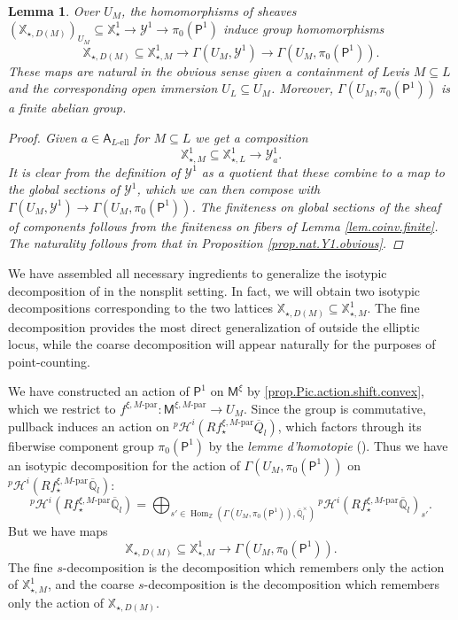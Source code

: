 \documentclass[openany]{amsbook}
\newtheorem{lemma}[theorem]{Lemma}
\theoremstyle{definition}
\theoremstyle{remark}
\numberwithin{equation}{section}
\newcommand{\Q}{\mathbb{Q}}
\newcommand{\Z}{\mathbb{Z}}
\newcommand{\cY}{\mathcal{Y}}
\newcommand{\ol}[1]{\overline{#1}}
\renewcommand{\-}{\operatorname{-}}
\newcommand{\Hom}{\operatorname{Hom}}
\newcommand{\pHi}{{}^p \mathcal{H}^i}
\newcommand{\el}{\text{-ell}}
\newcommand{\bM}{\mathsf{M}}
\newcommand{\bA}{\mathsf{A}}
\newcommand{\bX}{\mathbb{X}}
\newcommand{\bAe}[1]{\bA_{#1\el}}
\newcommand{\bP}{\mathsf{P}}
\newcommand{\Mpar}{M\text{-par}}
\begin{document}
\begin{lemma}\label{lem.glblsect.Pcmpts.finite}
    Over $U_M$, the homomorphisms of sheaves $(\bX_{\star, D(M)})_{U_M} \subseteq \bX_{\star}^1 \to \cY^1 \to \pi_0(\bP^{1})$ induce group homomorphisms
    $$
        \bX_{\star, D(M)} \subseteq \bX_{\star,M}^1 \to \Gamma(U_M, \cY^1) \to \Gamma(U_M, \pi_0(\bP^{1})).
    $$
    These maps are natural in the obvious sense given a containment of Levis $M \subseteq L$ and the corresponding open immersion $U_L \subseteq U_M$. Moreover, $\Gamma(U_M, \pi_0(\bP^{1}))$ is a finite abelian group.
    \begin{proof}
        Given $a \in \bAe{L}$ for $M \subseteq L$ we get a composition $$\bX_{\star, M}^1 \subseteq \bX_{\star, L}^1 \to \cY^1_a.$$ It is clear from the definition of $\cY^1$ as a quotient that these combine to a map to the global sections of $\cY^1$, which we can then compose with $\Gamma(U_M, \cY^1) \to \Gamma(U_M, \pi_0(\bP^{1}))$. The finiteness on global sections of the sheaf of components follows from the finiteness on fibers of Lemma \ref{lem.coinv.finite}. The naturality follows from that in Proposition \ref{prop.nat.Y1.obvious}.
    \end{proof}
\end{lemma}



We have assembled all necessary ingredients to generalize the isotypic decomposition of \cite[8.5]{CLII} in the nonsplit setting. In fact, we will obtain two isotypic decompositions corresponding to the two lattices $\bX_{\star, D(M)} \subseteq \bX_{\star,M}^1$. The fine decomposition provides the most direct generalization of \cite[\S 6.2]{ngofl} outside the elliptic locus, while the coarse decomposition will appear naturally for the purposes of point-counting.

We have constructed an action of $\bP^{1}$ on $\bM^{\xi}$ by \ref{prop.Pic.action.shift.convex}, which we restrict to $f^{\xi, \Mpar} : \bM^{\xi, \Mpar} \to U_M$. Since the group is commutative, pullback induces an action on $\pHi(R f_\star^{\xi, \Mpar} \ol{Q}_l)$, which factors through its fiberwise component group $\pi_0(\bP^{1})$ by the \textit{lemme d'homotopie} (\cite[Lemme 3.2.3]{ngolaumonunitaire}). Thus we have an isotypic decomposition for the action of $\Gamma(U_M, \pi_0(\bP^{1}))$ on $\pHi(R f_\star^{\xi, \Mpar} \ol{\Q}_l)$:
$$
    \pHi(R f_\star^{\xi, \Mpar} \ol{\Q}_l) = \bigoplus_{s' \in \Hom_{\Z}(\Gamma(U_M, \pi_0(\bP^{1})), \ol{\Q}_l^\times)} \pHi(R f_\star^{\xi, \Mpar} \ol{\Q}_l)_{s'}.
$$
But we have maps
$$
    \bX_{\star,D(M)} \subseteq \bX_{\star,M}^1 \to \Gamma(U_M, \pi_0(\bP^1)).
$$
The fine $s$-decomposition is the decomposition which remembers only the action of $\bX_{\star, M}^1$, and the coarse $s$-decomposition is the decomposition which remembers only the action of $\bX_{\star,D(M)}$. 
\end{document}
